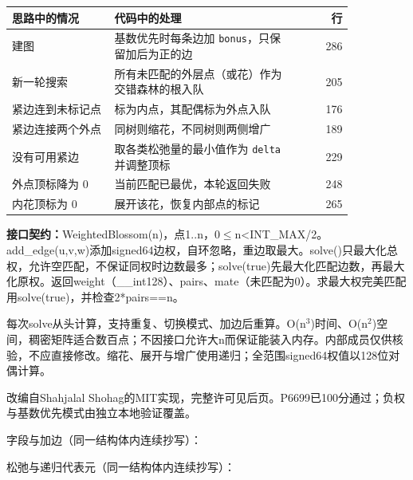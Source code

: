 \begin{center}\small
\begin{tabular}{@{}p{0.30\linewidth}p{0.55\linewidth}r@{}}
\toprule
思路中的情况 & 代码中的处理 & 行\\
\midrule
建图 & 基数优先时每条边加 \texttt{bonus}，只保留加后为正的边 & 286\\
新一轮搜索 & 所有未匹配的外层点（或花）作为交错森林的根入队 & 205\\
紧边连到未标记点 & 标为内点，其配偶标为外点入队 & 176\\
紧边连接两个外点 & 同树则缩花，不同树则两侧增广 & 189\\
没有可用紧边 & 取各类松弛量的最小值作为 \texttt{delta} 并调整顶标 & 229\\
外点顶标降为 0 & 当前匹配已最优，本轮返回失败 & 248\\
内花顶标为 0 & 展开该花，恢复内部点的标记 & 265\\
\bottomrule
\end{tabular}
\end{center}



{\sloppy{}\noindent\textbf{接口契约：}WeightedBlossom(n)，点1..n，0$\le$n<INT\_MAX/2。add\_edge(u,v,w)添加signed64边权，自环忽略，重边取最大。solve()只最大化总权，允许空匹配，不保证同权时边数最多；solve(true)先最大化匹配边数，再最大化原权。返回weight（\_\_int128）、pairs、mate（未匹配为0）。求最大权完美匹配用solve(true)，并检查2*pairs==n。

每次solve从头计算，支持重复、切换模式、加边后重算。O(n$^{3}$)时间、O(n$^{2}$)空间，稠密矩阵适合数百点；不因接口允许大n而保证能装入内存。内部成员仅供核验，不应直接修改。缩花、展开与增广使用递归；全范围signed64权值以128位对偶计算。

改编自Shahjalal Shohag的MIT实现，完整许可见后页。P6699已100分通过；负权与基数优先模式由独立本地验证覆盖。\par}

字段与加边（同一结构体内连续抄写）：

\Needspace{492pt}



\newpage

松弛与递归代表元（同一结构体内连续抄写）：



\newpage

